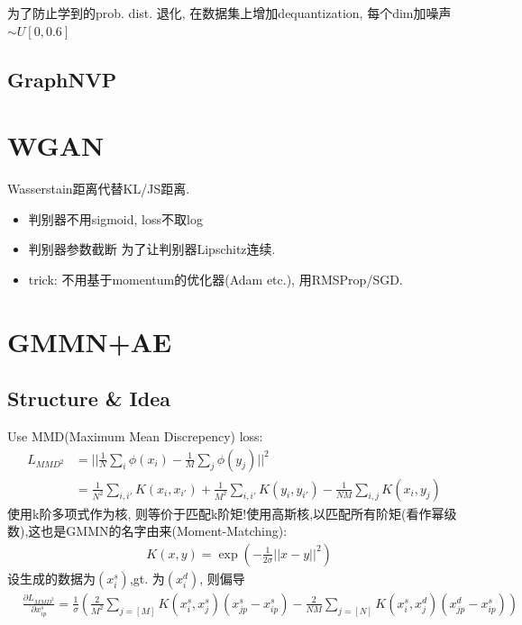 \documentclass{article}
\begin{document}
     为了防止学到的prob. dist. 退化, 在数据集上增加dequantization, 每个dim加噪声$\sim U[0, 0.6]$



\subsection{GraphNVP}

\section{WGAN}

     Wasserstain距离代替KL/JS距离.

     \begin{itemize}
        \item 判别器不用sigmoid, loss不取log
        \item 判别器参数截断 \trarr 为了让判别器Lipschitz连续.
        \item trick: 不用基于momentum的优化器(Adam etc.), 用RMSProp/SGD.
    \end{itemize}

\section{GMMN+AE}
\subsection{Structure \& Idea}

    Use MMD(Maximum Mean Discrepency) loss:
    \begin{align}
        L_{MMD^2}&=||\frac 1 N \sum_i \phi(x_i) - \frac 1 M\sum_j \phi(y_j)||^2\\
        &=\frac 1 {N^2} \sum_{i,i'} K(x_i, x_{i'}) + \frac 1 {M^2} \sum_{i,i'} K(y_i, y_{i'}) - \frac{1}{NM} \sum_{i,j} K(x_i, y_j)
    \end{align}
    使用k阶多项式作为核, 则等价于匹配k阶矩!\trarr 使用高斯核,以匹配所有阶矩(看作幂级数),这也是GMMN的名字由来(Moment-Matching):
    \begin{align}
        &K(x, y) = \exp(-\frac{1}{2\sigma} ||x-y||^2)
    \end{align}
    设生成的数据为$(x_i^s)$,gt. 为$(x_i^d)$, 则偏导
    \begin{align}
        &\frac{\partial L_{MMD^2}}{\partial x^s_{ip}} = 
        \frac{1}{\sigma} \left(
            \frac{2}{M^2} \sum_{j=[M]}K(x_i^s, x_j^s)(x_{jp}^s-x_{ip}^s) - 
            \frac{2}{NM} \sum_{j=[N]}K(x_i^s, x_j^d)(x_{jp}^d-x_{ip}^s) 
        \right) 
    \end{align}
\end{document}

